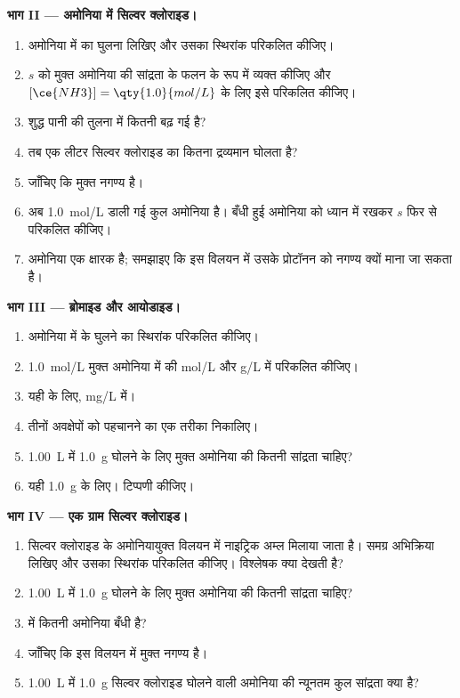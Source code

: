 \begin{problem}
\medskip
\noindent\textbf{भाग II --- अमोनिया में सिल्वर क्लोराइड।}
\begin{enumerate}[resume]
  \item अमोनिया में  का घुलना लिखिए और उसका
        स्थिरांक परिकलित कीजिए।
  \item {} $s$ को मुक्त अमोनिया की
        सांद्रता के फलन के रूप में व्यक्त कीजिए और $[\ce{NH3}] = \qty{1.0}{mol/L}$ के लिए इसे परिकलित कीजिए।
  \item शुद्ध पानी की तुलना में  कितनी बढ़ गई है?
  \item तब एक लीटर सिल्वर क्लोराइड का कितना द्रव्यमान घोलता है?
  \item जाँचिए कि मुक्त  नगण्य है।
  \item अब \qty{1.0}{mol/L} डाली गई कुल अमोनिया है। बँधी हुई
        अमोनिया को ध्यान में रखकर $s$ फिर से परिकलित कीजिए।
  \item अमोनिया एक क्षारक है; समझाइए कि इस विलयन में उसके प्रोटॉनन को नगण्य
        क्यों माना जा सकता है।
\end{enumerate}

\medskip
\noindent\textbf{भाग III --- ब्रोमाइड और आयोडाइड।}
\begin{enumerate}[resume]
  \item अमोनिया में  के घुलने का स्थिरांक परिकलित कीजिए।
  \item \qty{1.0}{mol/L} मुक्त अमोनिया में  की 
        \unit{mol/L} और \unit{g/L} में परिकलित कीजिए।
  \item यही  के लिए, \unit{mg/L} में।
  \item तीनों अवक्षेपों को पहचानने का एक तरीका निकालिए।
  \item \qty{1.00}{L} में \qty{1.0}{g}
         घोलने के लिए मुक्त अमोनिया की कितनी सांद्रता चाहिए?
  \item यही \qty{1.0}{g}  के लिए। टिप्पणी कीजिए।
\end{enumerate}

\medskip
\noindent\textbf{भाग IV --- एक ग्राम सिल्वर क्लोराइड।}
\begin{enumerate}[resume]
  \item सिल्वर क्लोराइड के अमोनियायुक्त विलयन में नाइट्रिक अम्ल
        मिलाया जाता है। समग्र अभिक्रिया लिखिए और उसका स्थिरांक परिकलित कीजिए। विश्लेषक
        क्या देखती है?
  \item \qty{1.00}{L} में \qty{1.0}{g}
         घोलने के लिए मुक्त अमोनिया की कितनी सांद्रता चाहिए?
  \item {} में कितनी अमोनिया बँधी है?
  \item जाँचिए कि इस विलयन में मुक्त  नगण्य है।
  \item \qty{1.00}{L} में \qty{1.0}{g} सिल्वर क्लोराइड घोलने वाली
        अमोनिया की न्यूनतम कुल सांद्रता क्या है?
\end{enumerate}
\end{problem}
